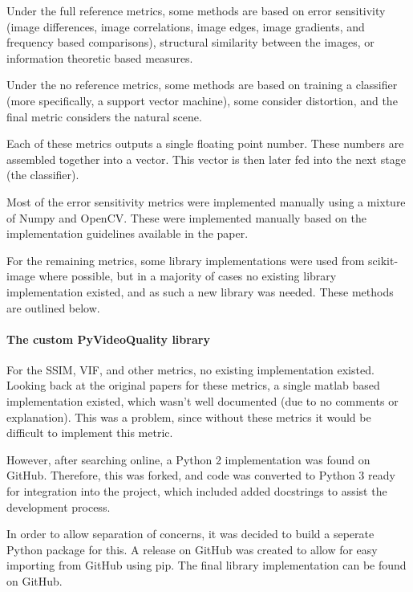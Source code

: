 \documentclass[11pt,a4paper]{article}
\begin{document}
            Under the full reference metrics, some methods are based on error sensitivity (image differences, image correlations, image edges, image gradients, and frequency based comparisons),
            structural similarity between the images, or information theoretic based measures.

            Under the no reference metrics, some methods are based on training a classifier (more specifically, a support vector machine), some consider distortion, and the final metric considers the natural scene.
            
            Each of these metrics outputs a single floating point number. These numbers are assembled together into a vector. This vector is then later fed into the next stage (the classifier).

            Most of the error sensitivity metrics were implemented manually using a mixture of Numpy and OpenCV. These were implemented manually based on the implementation guidelines available in the paper.

            For the remaining metrics, some library implementations were used from scikit-image where possible, but in a majority of cases no existing library implementation existed, and as such a new library
            was needed. These methods are outlined below.

            \paragraph{The custom PyVideoQuality library}
            For the SSIM, VIF, and other metrics, no existing implementation existed. Looking back at the original papers for these metrics, a single matlab based implementation existed, which wasn't well documented (due to no comments or
            explanation). This was a problem, since without these metrics it would be difficult to implement this metric.
            
            However, after searching online, a Python 2 implementation was found on GitHub. \cite{VideoQualityOriginal} Therefore, this was forked, and code was converted to Python 3 ready for integration into the project, which included added docstrings to assist the development process. 
            
            In order to allow separation of concerns, it was decided to build a seperate Python package for this. A release on GitHub was created to allow for easy importing from GitHub using pip. The final library implementation can be found on GitHub. \cite{VideoQualityUpdated}
\end{document}
